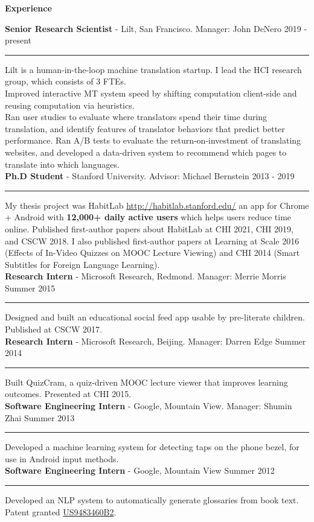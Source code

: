 \documentclass[10pt,A4]{article}
\newcommand{\cvsection}[1]
{
	\begin{center}
		\large\textcolor{sectcol}{\textbf{#1}}
	\end{center}
}
\newcommand{\cvevtzero}[4]
{

	\textbf{#2} - \textcolor{bgcol}{#3} \hfill \vspace{2.5pt}\textcolor{sectcol}{#1}

\vspace{-8pt}
\textcolor{softcol}{\hrule}
\vspace{6pt}

}
\newcommand{\cvevtone}[4]
{

	\textbf{#2} - \textcolor{bgcol}{#3} \hfill \vspace{2.5pt}\textcolor{sectcol}{#1}

\vspace{-8pt}
\textcolor{softcol}{\hrule}
\vspace{6pt}

  #4\\[3pt]

}
\begin{document}
\cvsection{Experience}

\cvevtzero{2019 - present}{Senior Research Scientist}{Lilt, San Francisco. Manager: John DeNero}\\
Lilt is a human-in-the-loop machine translation startup. I lead the HCI research group, which consists of 3 FTEs.\\
Improved interactive MT system speed by shifting computation client-side and reusing computation via heuristics.\\
Ran user studies to evaluate where translators spend their time during translation, and identify features of translator behaviors that predict better performance. Ran A/B tests to evaluate the return-on-investment of translating websites, and developed a data-driven system to recommend which pages to translate into which languages.\\

\cvevtzero{2013 - 2019}{Ph.D Student}{Stanford University. Advisor: Michael Bernstein}\\
My thesis project was HabitLab \url{http://habitlab.stanford.edu/} an app for Chrome + Android with \textbf{12,000+ daily active users} which helps users reduce time online. Published first-author papers about HabitLab at CHI 2021, CHI 2019, and CSCW 2018. I also published first-author papers at Learning at Scale 2016 (Effects of In-Video Quizzes on MOOC Lecture Viewing) and CHI 2014 (Smart Subtitles for Foreign Language Learning).\\ %

%
\cvevtone{Summer 2015}{Research Intern}{Microsoft Research, Redmond. Manager: Merrie Morris}{Designed and built an educational social feed app usable by pre-literate children. Published at CSCW 2017.}

\cvevtone{Summer 2014}{Research Intern}{Microsoft Research, Beijing. Manager: Darren Edge}{Built QuizCram, a quiz-driven MOOC lecture viewer that improves learning outcomes. Presented at CHI 2015.}

\cvevtone{Summer 2013}{Software Engineering Intern}{Google, Mountain View. Manager: Shumin Zhai}{Developed a machine learning system for detecting taps on the phone bezel, for use in Android input methods.}

\cvevtone{Summer 2012}{Software Engineering Intern}{Google, Mountain View}{Developed an NLP system to automatically generate glossaries from book text. Patent granted \href{https://patents.google.com/patent/US9483460B2}{US9483460B2}.}
\end{document}
